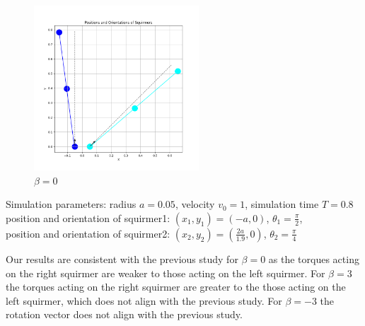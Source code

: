\documentclass{article}
\begin{document}
\begin{figure}[H]
    \centering
    \includegraphics[width=0.55\textwidth]{graphs/simulations/sim_sq_sq/beta0/pi_4_.png}
    \caption{\footnotesize $\beta = 0$}
\end{figure}
\begin{center}
    Simulation parameters: radius $a=0.05$, velocity $v_0=1$, simulation time $T=0.8$\\
        position and orientation of squirmer1: $(x_1,y_1)=(-a,0)$, $\theta_1=\frac{\pi}{2}$,\\
        position and orientation of squirmer2: $(x_2,y_2)=(\frac{2a}{1.9},0)$, $\theta_2=\frac{\pi}{4}$
\end{center}
Our results are consistent with the previous study\cite{Stark} for $\beta = 0$ as the torques acting on the right 
squirmer are weaker to those acting on the left squirmer. For $\beta = 3$ the torques acting on the right squirmer are
greater to the those acting on the left squirmer, which does not align with the previous study.
For $\beta = -3$ the rotation vector does not align with the previous study.
\end{document}
